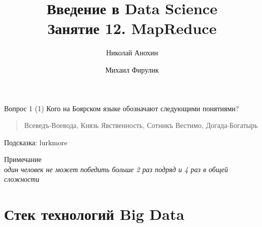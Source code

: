 \documentclass[10pt,a4paper]{beamer}
\author{Николай Анохин \and Михаил Фирулик}
\title{Введение в Data Science \\ Занятие 12. MapReduce}
\begin{document}
\maketitle



\begin{frame}{}

\begin{alertblock}{Вопрос 1 (1)}
Кого на Боярском языке обозначают следующими понятиями?
\begin{quote}
Всеведъ-Воевода, Князь Явственность, Сотникъ Вестимо, Догада-Богатырь
\end{quote}
Подсказка: lurkmore
\end{alertblock}

\vfill

Примечание \\ 
{\it один человек не может победить больше 2 раз подряд и 4 раз в общей сложности}

\end{frame}


\begin{frame}

\tableofcontents

\end{frame}


\section{Стек технологий Big Data}

\end{document}
